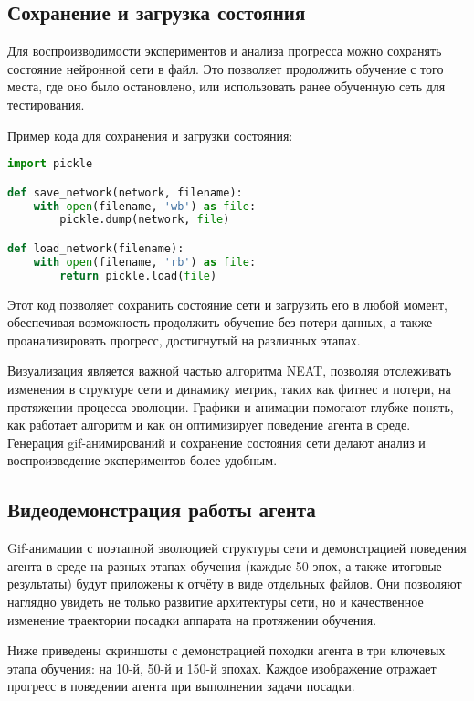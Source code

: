 \documentclass[a4paper,12pt]{article}
\begin{document}
\subsection{Сохранение и загрузка состояния}

Для воспроизводимости экспериментов и анализа прогресса можно сохранять состояние нейронной сети в файл. Это позволяет продолжить обучение с того места, где оно было остановлено, или использовать ранее обученную сеть для тестирования.

Пример кода для сохранения и загрузки состояния:

\begin{lstlisting}[language=Python]
import pickle

def save_network(network, filename):
    with open(filename, 'wb') as file:
        pickle.dump(network, file)

def load_network(filename):
    with open(filename, 'rb') as file:
        return pickle.load(file)
\end{lstlisting}

Этот код позволяет сохранить состояние сети и загрузить его в любой момент, обеспечивая возможность продолжить обучение без потери данных, а также проанализировать прогресс, достигнутый на различных этапах.

Визуализация является важной частью алгоритма NEAT, позволяя отслеживать изменения в структуре сети и динамику метрик, таких как фитнес и потери, на протяжении процесса эволюции. Графики и анимации помогают глубже понять, как работает алгоритм и как он оптимизирует поведение агента в среде. Генерация gif-анимирований и сохранение состояния сети делают анализ и воспроизведение экспериментов более удобным.

\subsection{Видеодемонстрация работы агента}

Gif-анимации с поэтапной эволюцией структуры сети и демонстрацией поведения агента в среде на разных этапах обучения (каждые 50 эпох, а также итоговые результаты) будут приложены к отчёту в виде отдельных файлов. Они позволяют наглядно увидеть не только развитие архитектуры сети, но и качественное изменение траектории посадки аппарата на протяжении обучения.

Ниже приведены скриншоты с демонстрацией походки агента в три ключевых этапа обучения: на 10-й, 50-й и 150-й эпохах. Каждое изображение отражает прогресс в поведении агента при выполнении задачи посадки.
\end{document}
